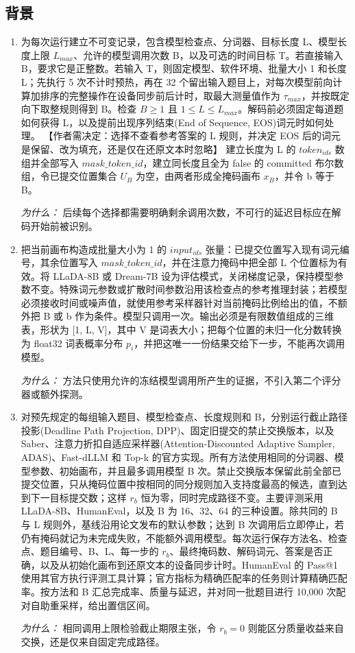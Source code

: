 \documentclass[10pt,a4paper]{article}
\begin{document}
\subsection*{背景}
\begin{enumerate}[leftmargin=*,start=1]
  \item 为每次运行建立不可变记录，包含模型检查点、分词器、目标长度 L、模型长度上限 \(L_{max}\)、允许的模型调用次数 B，以及可选的时间目标 T。若直接输入 B，要求它是正整数。若输入 T，则固定模型、软件环境、批量大小 1 和长度 L；先执行 5 次不计时预热，再在 32 个留出输入题目上，对每次模型前向计算加排序的完整操作在设备同步前后计时，取最大测量值作为 \(\tau _{max}\)，并按既定向下取整规则得到 B。检查 \(B \ge  1\) 且 \(1 \le  L \le  L_{max}\)。解码前必须固定每道题如何获得 L，以及提前出现序列结束(End of Sequence, EOS)词元时如何处理。 【作者需决定：选择不查看参考答案的 L 规则，并决定 EOS 后的词元是保留、改为填充，还是仅在还原文本时忽略】 建立长度为 L 的 \(token_{ids}\) 数组并全部写入 \(\mathit{mask\_token\_id}\)，建立同长度且全为 false 的 committed 布尔数组，令已提交位置集合 \(U_{B}\) 为空，由两者形成全掩码画布 \(x_{B}\)，并令 b 等于 B。
\par\emph{为什么：} 后续每个选择都需要明确剩余调用次数，不可行的延迟目标应在解码开始前被识别。
  \item 把当前画布构造成批量大小为 1 的 \(input_{ids}\) 张量：已提交位置写入现有词元编号，其余位置写入 \(\mathit{mask\_token\_id}\)，并在注意力掩码中把全部 L 个位置标为有效。将 LLaDA-8B 或 Dream-7B 设为评估模式，关闭梯度记录，保持模型参数不变。特殊词元参数或扩散时间参数沿用该检查点的参考推理封装；若模型必须接收时间或噪声值，就使用参考采样器针对当前掩码比例给出的值，不额外把 B 或 b 作为条件。模型只调用一次。输出必须是有限数值组成的三维表，形状为 [1, L, V]，其中 V 是词表大小；把每个位置的未归一化分数转换为 float32 词表概率分布 \(p_{i}\)，并把这唯一一份结果交给下一步，不能再次调用模型。
\par\emph{为什么：} 方法只使用允许的冻结模型调用所产生的证据，不引入第二个评分器或额外探测。
  \item 对预先规定的每组输入题目、模型检查点、长度规则和 B，分别运行截止路径投影(Deadline Path Projection, DPP)、固定旧提交的禁止交换版本，以及 Saber、注意力折扣自适应采样器(Attention-Discounted Adaptive Sampler, ADAS)、Fast-dLLM 和 Top-k 的官方实现。所有方法使用相同的分词器、模型参数、初始画布，并且最多调用模型 B 次。禁止交换版本保留此前全部已提交位置，只从掩码位置中按相同的同分规则加入支持度最高的候选，直到达到下一目标提交数；这样 \(r_{b}\) 恒为零，同时完成路径不变。主要评测采用 LLaDA-8B、HumanEval，以及 B 为 16、32、64 的三种设置。除共同的 B 与 L 规则外，基线沿用论文发布的默认参数；达到 B 次调用后立即停止，若仍有掩码就记为未完成失败，不能额外调用模型。每次运行保存方法名、检查点、题目编号、B、L、每一步的 \(r_{b}\)、最终掩码数、解码词元、答案是否正确，以及从初始化画布到还原文本的设备同步计时。HumanEval 的 Pass@1 使用其官方执行评测工具计算；官方指标为精确匹配率的任务则计算精确匹配率。按方法和 B 汇总完成率、质量与延迟，并对同一批题目进行 10,000 次配对自助重采样，给出置信区间。
\par\emph{为什么：} 相同调用上限检验截止期限主张，令 \(r_{b}=0\) 则能区分质量收益来自交换，还是仅来自固定完成路径。
\end{enumerate}
\end{document}
